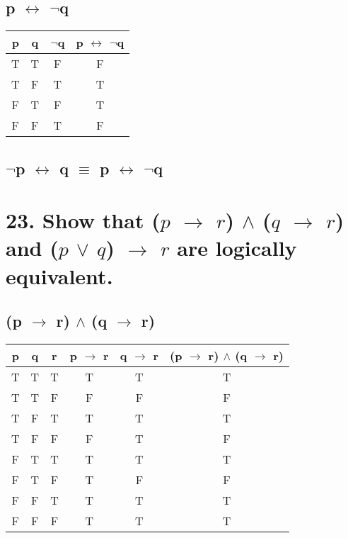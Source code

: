 \documentclass[11pt, oneside]{article} %
\numberwithin{equation}{section} %
\numberwithin{figure}{section} %
\begin{document}
\begin{table}[!htp]
\subsection{p $\leftrightarrow$ $\neg$q}
\begin{tabular}{c c c c}
\hline\hline
p & q & $\neg$q & p $\leftrightarrow$ $\neg$q \\ [0.5ex] %
\hline
T & T & F & F\\
T & F & T & T\\
F & T & F & T\\
F & F & T & F\\ [1ex]
\hline
\end{tabular}
\label{table:nonlin}
\subsection{$\neg$p $\leftrightarrow$ q $\equiv$ p $\leftrightarrow$ $\neg$q}
\end{table}

\begin{table}[!htp]
\section{23. Show that ($p$ $\rightarrow$ $r$) $\wedge$ ($q$ $\rightarrow$ $r$) and ($p$ $\vee$ $q$) $\rightarrow$ $r$ are logically equivalent.}
\subsection{(p $\rightarrow$ r) $\wedge$ (q $\rightarrow$ r)}
\begin{tabular}{c c c c c c}
\hline\hline
p & q & r & p $\rightarrow$ r & q $\rightarrow$ r & (p $\rightarrow$ r) $\wedge$ (q $\rightarrow$ r)\\ [0.5ex] %
\hline
T & T & T & T & T & T\\
T & T & F & F & F & F\\
T & F & T & T & T & T\\
T & F & F & F & T & F\\
F & T & T & T & T & T\\
F & T & F & T & F & F\\
F & F & T & T & T & T\\
F & F & F & T & T & T\\ [1ex]
\hline
\end{tabular}
\label{table:nonlin}
\end{table}
\end{document}
